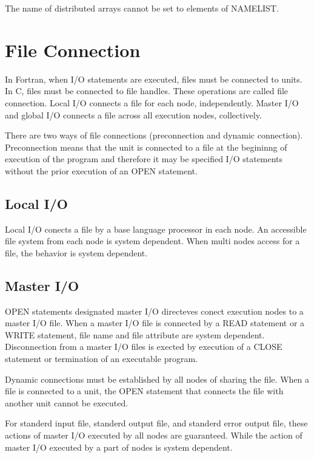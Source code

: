   The name of distributed arrays cannot be set to elements of NAMELIST.

  \section{File Connection}

  In Fortran, when I/O statements are executed, files must be
  connected to units. 
  In C, files must be connected to file handles. These operations are
  called file connection.
  Local I/O connects a file for each node, independently.
  Master I/O and global I/O connects a file across
  all execution nodes, collectively. 
  
  There are two ways of file connections (preconnection and dynamic
  connection).
  Preconnection means that the unit is connected to a file at the
  begininng of execution of the program and therefore it may be specified
  I/O statements without the prior execution of an OPEN
  statement.


  \subsection{Local I/O}

  Local I/O conects a file by a base language processor in each node.
  An accessible file system from each node is system dependent.
  When multi nodes access for a file, the behavior is system dependent.

  
  \subsection{Master I/O}
  
  OPEN statements designated master I/O directeves conect execution
  nodes to a master I/O file.
  When a master I/O file is connected by a READ statement or a WRITE
  statement, file name and file attribute are system dependent.
  Disconnection from a master I/O files is exected by execution of a CLOSE
  statement or termination of an executable program.

  Dynamic connections must be established by all nodes of sharing the
  file.
  When a file is connected to a unit, the OPEN statement that connects
  the file with another unit cannot be executed.

  For standerd input file, standerd output file, and standerd error
  output file, these actions of master I/O executed by all nodes are
  guaranteed.
  While the action of master I/O executed by a part of nodes is
  system dependent.



